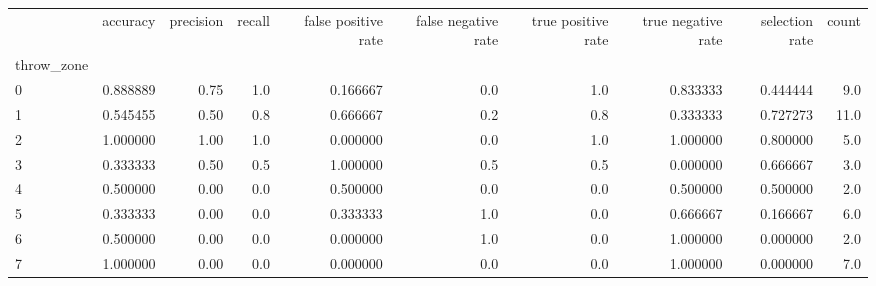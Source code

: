 \begin{tabular}{lrrrrrrrrr}
\toprule
{} &  accuracy &  precision &  recall &  false positive rate &  false negative rate &  true positive rate &  true negative rate &  selection rate &  count \\
throw\_zone &           &            &         &                      &                      &                     &                     &                 &        \\
\midrule
0          &  0.888889 &       0.75 &     1.0 &             0.166667 &                  0.0 &                 1.0 &            0.833333 &        0.444444 &    9.0 \\
1          &  0.545455 &       0.50 &     0.8 &             0.666667 &                  0.2 &                 0.8 &            0.333333 &        0.727273 &   11.0 \\
2          &  1.000000 &       1.00 &     1.0 &             0.000000 &                  0.0 &                 1.0 &            1.000000 &        0.800000 &    5.0 \\
3          &  0.333333 &       0.50 &     0.5 &             1.000000 &                  0.5 &                 0.5 &            0.000000 &        0.666667 &    3.0 \\
4          &  0.500000 &       0.00 &     0.0 &             0.500000 &                  0.0 &                 0.0 &            0.500000 &        0.500000 &    2.0 \\
5          &  0.333333 &       0.00 &     0.0 &             0.333333 &                  1.0 &                 0.0 &            0.666667 &        0.166667 &    6.0 \\
6          &  0.500000 &       0.00 &     0.0 &             0.000000 &                  1.0 &                 0.0 &            1.000000 &        0.000000 &    2.0 \\
7          &  1.000000 &       0.00 &     0.0 &             0.000000 &                  0.0 &                 0.0 &            1.000000 &        0.000000 &    7.0 \\
\bottomrule
\end{tabular}
